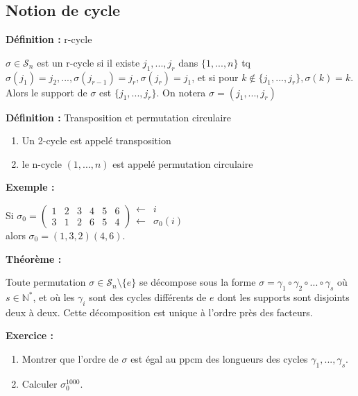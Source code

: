 \documentclass{report}
\newenvironment{definition}[1][]{
    \begin{tcolorbox}[colframe= white]
    \textbf{Définition :} 
    #1 \par
    }
    {\end{tcolorbox}}
\newenvironment{exemple}{\begin{tcolorbox}[colback=gray!10,colframe= white]
    \textbf{Exemple :}
     \par}
    {\end{tcolorbox}}
\newenvironment{exo}{\begin{tcolorbox}[colframe= white]
    \textbf{Exercice :}
    \par}
    {\end{tcolorbox}}
\newenvironment{theoreme}[1][]{
    \begin{tcolorbox}[]
    \textbf{Théorème :} #1  \par} 
    {\end{tcolorbox}}
\newcommand{\N}{\mathbb{N}}
\newcommand{\sn}{\mathcal{S}_{n}}
\newcommand{\unn}{\{1, ..., n\}}
\newcommand{\dsp}{\displaystyle}
\begin{document}
\subsection{Notion de cycle}
\begin{definition}[r-cycle]
$\sigma \in\sn$ est un r-cycle si il existe $j_1, ..., j_r$ dans $\unn$ tq $\sigma(j_1)=j_2, ..., \sigma(j_{r-1})=j_r, \sigma(j_r)=j_1$, et si pour $k\notin\{j_1,...,j_r\}, \sigma(k)=k$.\\Alors le support de $\sigma$ est $\{j_1,...,j_r\}$. On notera $\sigma = (j_1, ..., j_r)$
\end{definition}

\begin{definition}[Transposition et permutation circulaire]
\begin{enumerate}
\item Un 2-cycle est appelé transposition
\item le n-cycle $(1, ..., n)$ est appelé permutation circulaire
\end{enumerate}
\end{definition}

\begin{exemple}
Si $\dsp\sigma_0=\left(\begin{array}{cccccc}
1&2&3&4&5&6\\3&1&2&6&5&4
\end{array}\right)
\begin{array}{cl}
\leftarrow&i\\\leftarrow&\sigma_0(i)
\end{array}$\\
alors $\sigma_0=(1,3,2)(4,6)$.
\end{exemple}

\begin{theoreme}
Toute permutation $\sigma\in\sn\setminus\{e\}$ se décompose sous la forme $\sigma=\gamma_1\circ\gamma_2\circ ... \circ\gamma_s$ où $s\in\N^*$, et où les $\gamma_i$ sont des cycles différents de $e$ dont les supports sont disjoints deux à deux. Cette décomposition est unique à l'ordre près des facteurs.
\end{theoreme}

\begin{exo}
\begin{enumerate}
\item Montrer que l'ordre de $\sigma$ est égal au ppcm des longueurs des cycles $\gamma_1, ..., \gamma_s$.
\item Calculer $\sigma_0^{1000}$.
\end{enumerate}
\end{exo}
\end{document}
